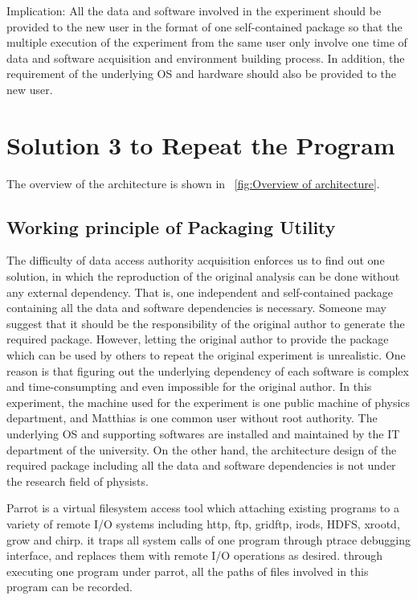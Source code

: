 \documentclass{acm_proc_article-sp}
\begin{document}
Implication: All the data and software involved in the experiment should be provided to the new user in the format of one self-contained package so that the multiple execution of the experiment from the same user only involve one time of data and software acquisition and environment building process. In addition, the requirement of the underlying OS and hardware should also be provided to the new user.

\section{Solution 3 to Repeat the Program}
The overview of the architecture is shown in ~\ref{fig:Overview of architecture}.

\subsection{Working principle of Packaging Utility}
The difficulty of data access authority acquisition enforces us to find out one solution, in which the reproduction of the original analysis can be done without any external dependency. That is, one independent and self-contained package containing all the data and software dependencies is necessary. Someone may suggest that it should be the responsibility of the original author to generate the required package. However, letting the original author to provide the package which can be used by others to repeat the original experiment is unrealistic. One reason is that figuring out the underlying dependency of each software is complex and time-consumpting and even impossible for the original author. In this experiment, the machine used for the experiment is one public machine of physics department, and Matthias is one common user without root authority. The underlying OS and supporting softwares are installed and maintained by the IT department of the university. On the other hand, the architecture design of the required package including all the data and software dependencies is not under the research field of physists.

Parrot is a virtual filesystem access tool which attaching existing programs to a variety of remote I/O systems including http, ftp, gridftp, irods, HDFS, xrootd, grow and chirp. it traps all system calls of one program through ptrace debugging interface, and replaces them with remote I/O operations as desired. through executing one program under parrot, all the paths of files involved in this program can be recorded.  
\end{document}
